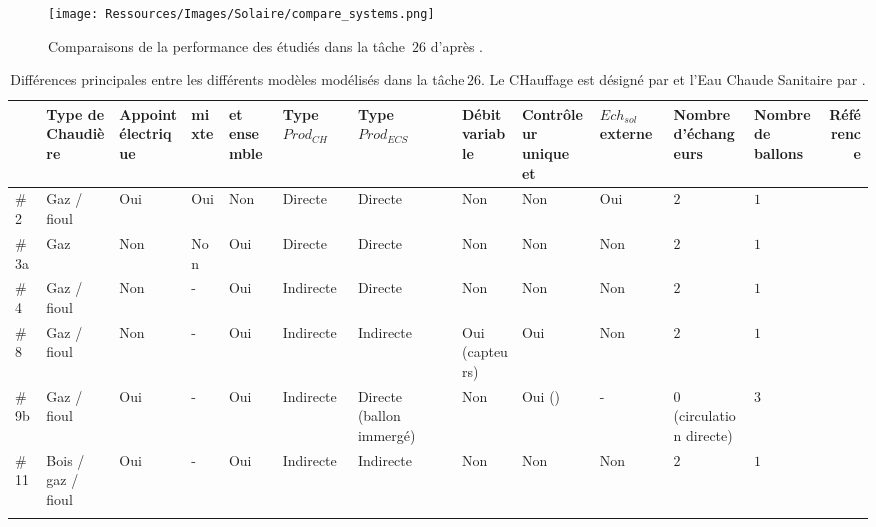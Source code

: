 \begin{figure}
    \centering
    \texttt{[image: Ressources/Images/Solaire/compare\_systems.png]}
    \caption{Comparaisons de la performance des  étudiés dans la tâche
             \,$26$ d’après \textcite{Task26C2007}.}
    \label{fig:compare_perf_ssc}
\end{figure}

\begin{landscape}
\begin{table}
\centering
\small
\caption{Différences principales entre les différents modèles modélisés dans la tâche\,$26$.
         Le CHauffage est désigné par  et l’Eau Chaude Sanitaire par .}
\label{tab:diff_ssc}
\begin{tabular}{l C{2cm} C{1.5cm} C{0.6cm} C{1.4cm} C{1.7cm} C{1.7cm} C{1.2cm} C{1.5cm} C{1.2cm} C{2.5cm} C{1cm} r}
    \toprule
            & Type de Chaudière    & Appoint électrique  &  mixte  &  et  ensemble &
              Type $Prod_{CH}$ & Type $Prod_{ECS}$ & Débit  variable & Contrôleur unique  et  &
              $Ech_{sol}$ externe & Nombre d’échangeurs & Nombre de ballons & Référence                           \\
    \midrule
    \addlinespace[1.5\defaultaddspace]
    \#2 & Gaz / fioul & Oui & Oui & Non & Directe & Directe & Non & Non & Oui & $2$ & $1$ & \cite{Ellehauge2002}  \\
    \addlinespace[1.5\defaultaddspace]
    \#3a  & Gaz & Non & Non & Oui & Directe & Directe & Non & Non & Non & $2$ & $1$ & \cite{Cheze2002}  \\
    \addlinespace[1.5\defaultaddspace]
    \#4 & Gaz /  fioul  & Non & - & Oui & Indirecte & Directe & Non & Non & Non & $2$ & $1$ & \cite{Shah2002} \\
    \addlinespace[1.5\defaultaddspace]
    \#8 & Gaz / fioul & Non & - & Oui & Indirecte & Indirecte & Oui (capteurs)  & Oui & Non & $2$ & $1$ & \cite{Bony2002} \\
    \addlinespace[1.5\defaultaddspace]
    \#9b  & Gaz / fioul & Oui & - & Oui & Indirecte & Directe (ballon immergé)  & Non & Oui ()  & - & $0$ (circulation directe) & $3$ & \cite{Peter2003}  \\
    \addlinespace[1.5\defaultaddspace]
    \#11  & Bois / gaz / fioul  & Oui & - & Oui & Indirecte & Indirecte & Non & Non & Non & $2$ & $1$ & \cite{Bales2002}  \\
    \addlinespace[1.5\defaultaddspace]

\end{tabular}
\end{table}
\end{landscape}
